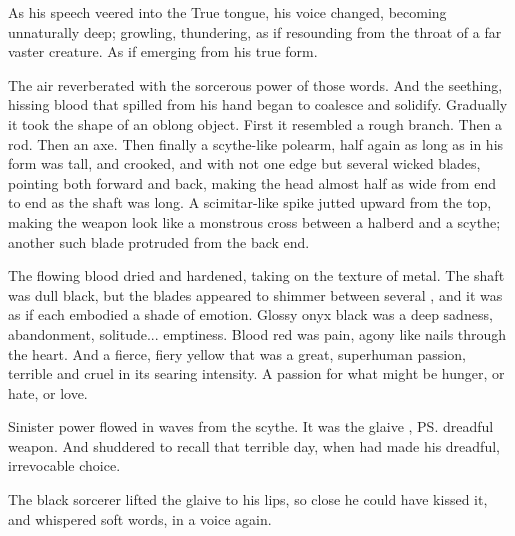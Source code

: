 As his speech veered into the True \Draconic{} tongue, his voice changed, becoming unnaturally deep; growling, thundering, as if resounding from the throat of a far vaster creature. 
As if emerging from his true form. 

The air reverberated with the sorcerous power of those words. 
And the seething, hissing blood that spilled from his hand began to coalesce and solidify. 
Gradually it took the shape of an oblong object. 
First it resembled a rough branch. 
Then a rod. 
Then an axe. 
Then finally a scythe-like polearm, half again as long as \Ishnaruchaefir{} in his \scathaese{} form was tall, and crooked, and with not one edge but several wicked blades, pointing both forward and back, making the head almost half as wide from end to end as the shaft was long. 
A scimitar-like spike jutted upward from the top, making the weapon look like a monstrous cross between a halberd and a scythe; another such blade protruded from the back end. 

The flowing blood dried and hardened, taking on the texture of metal. 
The shaft was dull black, but the blades appeared to shimmer between several \colours, and it was as if each \colour embodied a shade of emotion. 
Glossy onyx black was a deep sadness, abandonment, solitude... emptiness. 
Blood red was pain, agony like nails through the heart. 
And a fierce, fiery yellow that was a great, superhuman passion, terrible and cruel in its searing intensity. 
A passion for what might be hunger, or hate, or love. 

Sinister power flowed in waves from the scythe. 
It was the glaive \AeocrithRystessakhin, \ps{\Ishnaruchaefir}{} dreadful weapon. 
And \Criseis{} shuddered to recall that terrible day, when \QuessanthIshnaruchaefir{} had made his dreadful, irrevocable choice. 

The black sorcerer lifted the glaive to his lips, so close he could have kissed it, and whispered soft words, in a \scathaese{} voice again. 


